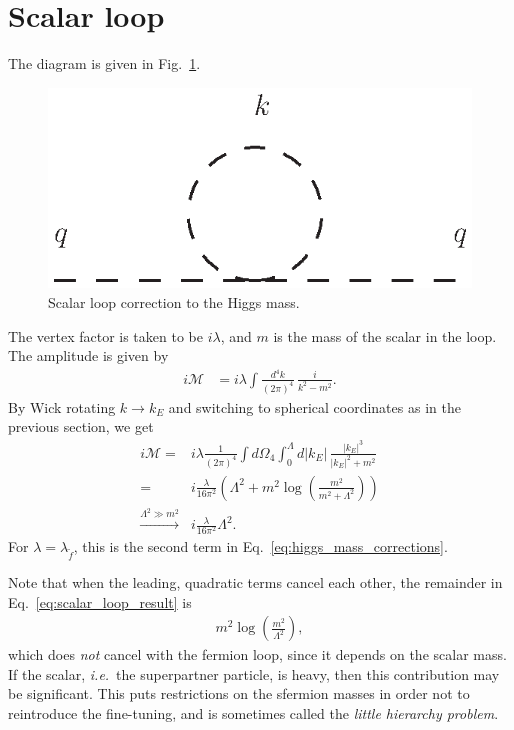 \documentclass[twoside,english]{uiofysmaster}
\begin{document}
\section{Scalar loop}
The diagram is given in Fig.\ \ref{fig:appendix_higgs_stop_loop}.
\begin{figure}[hbt]
\centering
\includegraphics[scale=1]{figures/appendix/higgs_stop_loop_with_momenta.eps}
\caption{Scalar loop correction to the Higgs mass.}
\label{fig:appendix_higgs_stop_loop}
\end{figure}
The vertex factor is taken to be $i\lambda$, and $m$ is the mass of the scalar in the loop. The amplitude is given by
\begin{align}
	i\mathcal{M} &= i\lambda \int \frac{d^4k}{(2\pi)^4}\, \frac{i}{k^2-m^2}.
\end{align}
By Wick rotating $k\to k_E$ and switching to spherical coordinates as in the previous section, we get
\begin{align}
	i\mathcal{M}= &i\lambda \frac{1}{(2\pi)^4}\int d\Omega_4 \int_0^\Lambda d|k_E| \, \frac{|k_E|^3}{|k_E|^2 + m^2}\nonumber\\
				= &i\frac{\lambda}{16\pi^2} \left(\Lambda^2 + m^2\log \left( \frac{m^2}{m^2+\Lambda^2} \right) \right)\label{eq:scalar_loop_result}\\
				\overset{\Lambda^2 \gg m^2}{\to} &i\frac{\lambda}{16\pi^2} \Lambda^2.\nonumber
\end{align}
For $\lambda = \lambda_{\tilde f}$, this is the second term in Eq.\ \eqref{eq:higgs_mass_corrections}. 

Note that when the leading, quadratic terms cancel each other, the remainder in Eq.\ \eqref{eq:scalar_loop_result} is 
\begin{align}
	m^2\log \left( \frac{m^2}{\Lambda^2} \right),
\end{align}
which does {\it not} cancel with the fermion loop, since it depends on the scalar mass. If the scalar, {\it i.e.}\ the superpartner particle, is heavy, then this contribution may be significant. This puts restrictions on the sfermion masses in order not to reintroduce the fine-tuning, and is sometimes called the {\it little hierarchy problem}.
\end{document}
